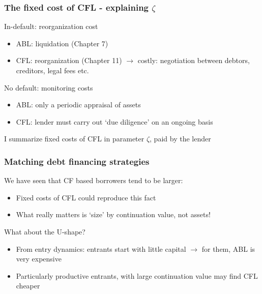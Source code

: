 \documentclass[notes]{beamer}
\begin{document}
\begin{frame}[label = zeta] 
\frametitle{The fixed cost of CFL - explaining $\zeta$ }
In-default:  reorganization cost
\begin{itemize}
\item ABL: liquidation (Chapter 7) 
\item CFL: reorganization (Chapter 11) $\rightarrow$ costly: negotiation between debtors, creditors, legal fees etc.
\end{itemize} \vspace{3mm}
No default: monitoring costs
\begin{itemize}
\item ABL: only a periodic appraisal of assets
\item CFL: lender must carry out `due diligence' on an ongoing basis
\end{itemize} 	\vspace{3mm}
I summarize fixed costs of CFL in parameter $\zeta$, paid by the lender 

\end{frame}

\begin{frame}
\frametitle{Matching debt financing strategies}
We have seen that CF based borrowers tend to be larger:
\begin{itemize}
\item Fixed costs of CFL could reproduce this fact
\item What really matters is `size' by continuation value, not assets!
\end{itemize} \vspace{3mm}

What about the U-shape? 
\begin{itemize}
\item From entry dynamics: entrants start with little capital $\rightarrow$ for them, ABL is very expensive
\item Particularly productive entrants, with large continuation value may find CFL cheaper
\end{itemize} \vspace{3mm}
\begin{center}  \hyperlink{firmstat}{}  \hspace{20mm} \hyperlink{Sector breakdown}{}  \end{center}

\end{frame}
\end{document}
